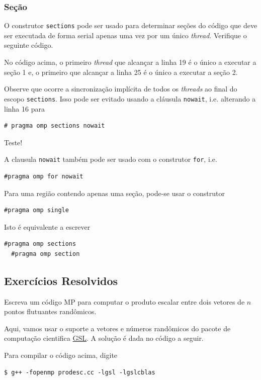 

\subsubsection{Seção}

O construtor \verb+sections+ pode ser usado para determinar seções do código que deve ser executada de forma serial apenas uma vez por um único {\it thread}. Verifique o seguinte código.



No código acima, o primeiro {\it thread} que alcançar a linha 19 é o único a executar a seção 1 e, o primeiro que alcançar a linha 25 é o único a executar a seção 2.

Observe que ocorre a sincronização implícita de todos os {\it threads} ao final do escopo \verb+sections+. Isso pode ser evitado usando a cláusula \verb+nowait+, i.e. alterando a linha 16 para
\begin{verbatim}
# pragma omp sections nowait
\end{verbatim}
Teste!

\begin{obs}
  A clausula \verb+nowait+ também pode ser usado com o construtor \verb+for+, i.e.
\begin{verbatim}
#pragma omp for nowait
\end{verbatim}
\end{obs}

Para uma região contendo apenas uma seção, pode-se usar o construtor
\begin{verbatim}
#pragma omp single
\end{verbatim}
Isto é equivalente a escrever
\begin{verbatim}
#pragma omp sections
  #pragma omp section
\end{verbatim}

\subsection*{Exercícios Resolvidos}

\begin{exeresol}\label{exeresol:produto_escalar}
  Escreva um código MP para computar o produto escalar entre dois vetores de $n$ pontos flutuantes randômicos.
\end{exeresol}
\begin{resol}
  Aqui, vamos usar o suporte a vetores e números randômicos do pacote de computação cientifica \href{https://www.gnu.org/software/gsl/}{GSL}. A solução é dada no código a seguir.

  

  Para compilar o código acima, digite
\begin{verbatim}
$ g++ -fopenmp prodesc.cc -lgsl -lgslcblas
\end{verbatim}
\end{resol}

